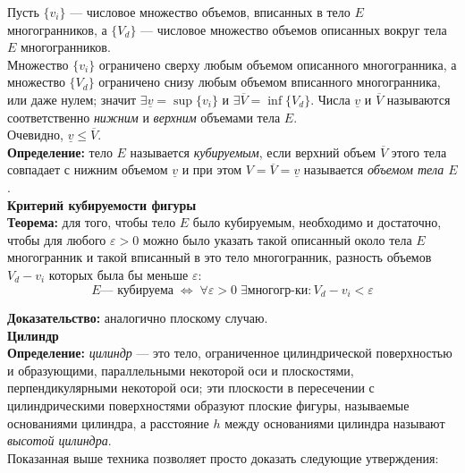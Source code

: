 \documentclass{article}
\begin{document}
  Пусть $\{v_i\}$ --- числовое множество объемов, вписанных в тело $E$ многогранников, а $\{V_d\}$ --- числовое множество объемов описанных вокруг тела $E$ многогранников. \\
  
  Множество $\{v_i\}$ ограничено сверху любым объемом описанного многогранника, а множество $\{V_d\}$ ограничено снизу любым объемом вписанного многогранника, или даже нулем; значит $\exists\underline v=\sup\{v_i\}$ и $\exists\overline V=\inf\{V_d\}$. Числа $\underline v$ и $\overline V$ называются соответственно \textit{нижним} и \textit{верхним} объемами тела $E$.\\
  
  Очевидно, $\underline v\leq \overline V$.\\
  
  \textbf{Определение:} тело $E$ называется \textit{кубируемым}, если верхний объем $\overline V$ этого тела совпадает с нижним объемом $\underline v$ и при этом $V=\overline V=\underline v$ называется \textit{объемом тела $E$}.\\
  
  \large\textbf{Критерий кубируемости фигуры}\normalsize\\
  
  \textbf{Теорема:} для того, чтобы тело $E$ было кубируемым, необходимо и достаточно, чтобы для любого $\varepsilon>0$ можно было указать такой описанный около тела $E$ многогранник и такой вписанный в это тело многогранник, разность объемов $V_d-v_i$ которых была бы меньше $\varepsilon$:
  \begin{equation}
    E\text{--- кубируема} \;\Leftrightarrow \;\forall\varepsilon>0\;\exists\text{многогр-ки}:V_d-v_i<\varepsilon
  \end{equation}
  
  \textbf{Доказательство:} аналогично плоскому случаю.\\
  
  \huge\textbf{Цилиндр}\normalsize\\
  
  \textbf{Определение:} \textit{цилиндр} --- это тело, ограниченное цилиндрической поверхностью и образующими, параллельными некоторой оси и плоскостями, перпендикулярными некоторой оси; эти плоскости в пересечении с цилиндрическими поверхностями образуют плоские фигуры, называемые основаниями цилиндра, а расстояние $h$ между основаниями цилиндра называют \textit{высотой цилиндра}.\\
  
  Показанная выше техника позволяет просто доказать следующие утверждения:\\
  
\end{document}
